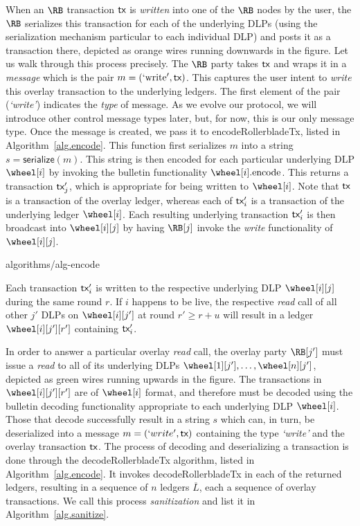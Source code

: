 When an $\RB$ transaction $\textsf{tx}$ is \emph{written} into one of the $\RB$ nodes by the user,
the $\RB$ serializes this transaction for each of the underlying DLPs (using the
serialization mechanism particular to each individual DLP) and posts it
as a transaction there, depicted as orange wires running downwards in the figure.
Let us walk through
this process precisely.
The $\RB$ party takes $\textsf{tx}$ and wraps it in a \emph{message}
which is the pair $m = (`\text{write}', \textsf{tx})$.
This captures the user intent to \emph{write} this overlay transaction to the underlying ledgers.
The first element of the pair (\emph{`write'}) indicates the \emph{type} of message.
As we evolve our protocol, we will introduce other control message types later, but,
for now, this is our only message type. Once the message is created, we pass it to
\textsf{encodeRollerbladeTx}, listed in Algorithm~\ref{alg.encode}.
This function first serializes $m$
into a string $s = \textsf{serialize}(m)$. This string is then encoded for each particular
underlying DLP $\wheel[i]$ by invoking the bulletin functionality $\wheel[i]\text{.encode}$.
This returns a transaction $\textsf{tx}'_j$, which is appropriate for being written to $\wheel[i]$.
Note that $\textsf{tx}$ is a transaction of the overlay ledger, whereas each of $\textsf{tx}'_i$ is a
transaction of the underlying ledger $\wheel[i]$. Each resulting underlying transaction $\textsf{tx}'_i$
is then broadcast into $\wheel[i][j]$ by having $\RB[j]$ invoke the \emph{write}
functionality of $\wheel[i][j]$.

{algorithms/alg-encode}

Each transaction $\textsf{tx}'_i$ is written to the respective underlying DLP $\wheel[i][j]$ during
the same round $r$. If $i$ happens to be live, the respective \emph{read} call of all
other $j'$ DLPs on $\wheel[i][j']$ at round $r' \geq r + u$ will result in a ledger
$\wheel[i][j'][r']$ containing $\textsf{tx}'_i$.

In order to answer a particular overlay \emph{read} call, the overlay party $\RB[j']$ must
issue a \emph{read} to all of its underlying DLPs $\wheel[1][j'], \ldots, \wheel[n][j']$,
depicted as green wires running upwards in the figure.
The transactions in $\wheel[i][j'][r']$ are of $\wheel[i]$ format,
and therefore must be decoded using the bulletin decoding functionality
appropriate to each underlying DLP $\wheel[i]$.
Those that decode successfully result in a string $s$ which can, in turn,
be deserialized into a message $m = (`write', \textsf{tx})$ containing the type \emph{`write'}
and the overlay transaction $\textsf{tx}$. The process of decoding and deserializing a transaction
is done through the \textsf{decodeRollerbladeTx} algorithm, listed in Algorithm~\ref{alg.encode}.
It invokes \textsf{decodeRollerbladeTx} in each of the returned ledgers, resulting
in a sequence of $n$ ledgers $\overline{L}$, each a sequence of overlay transactions.
We call this process \emph{sanitization} and list it in Algorithm~\ref{alg.sanitize}.

